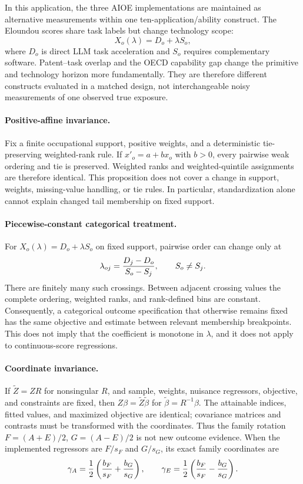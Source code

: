 In this application, the three AIOE implementations are maintained as
alternative measurements within one ten-application/ability construct.  The
Eloundou scores share task labels but change technology scope:
\[
X_o(\lambda)=D_o+\lambda S_o,
\]
where $D_o$ is direct LLM task acceleration and $S_o$ requires complementary
software.  Patent--task overlap and the OECD capability gap change the
primitive and technology horizon more fundamentally.  They are therefore
different constructs evaluated in a matched design, not interchangeable noisy
measurements of one observed true exposure.

\paragraph{Positive-affine invariance.}
Fix a finite occupational support, positive weights, and a deterministic
tie-preserving weighted-rank rule.  If $x'_o=a+b x_o$ with $b>0$, every pairwise
weak ordering and tie is preserved.  Weighted ranks and weighted-quintile
assignments are therefore identical.  This proposition does not cover a change
in support, weights, missing-value handling, or tie rules.  In particular,
standardization alone cannot explain changed tail membership on fixed support.

\paragraph{Piecewise-constant categorical treatment.}
For $X_o(\lambda)=D_o+\lambda S_o$ on fixed support, pairwise order can change
only at
\[
\lambda_{oj}={D_j-D_o\over S_o-S_j},\qquad S_o\ne S_j.
\]
There are finitely many such crossings.  Between adjacent crossing values the
complete ordering, weighted ranks, and rank-defined bins are constant.
Consequently, a categorical outcome specification that otherwise remains
fixed has the same objective and estimate between relevant membership
breakpoints.  This does not imply that the coefficient is monotone in
$\lambda$, and it does not apply to continuous-score regressions.

\paragraph{Coordinate invariance.}
If $\widetilde Z=ZR$ for nonsingular $R$, and sample, weights, nuisance
regressors, objective, and constraints are fixed, then $Z\beta=\widetilde
Z\widetilde\beta$ for $\widetilde\beta=R^{-1}\beta$.  The attainable indices,
fitted values, and maximized objective are identical; covariance matrices and
contrasts must be transformed with the coordinates.  Thus the family rotation
$F=(A+E)/2$, $G=(A-E)/2$ is not new outcome evidence.  When the implemented
regressors are $F/s_F$ and $G/s_G$, its exact family coordinates are
\[
\gamma_A={1\over2}\left({b_F\over s_F}+{b_G\over s_G}\right),\qquad
\gamma_E={1\over2}\left({b_F\over s_F}-{b_G\over s_G}\right).
\]

